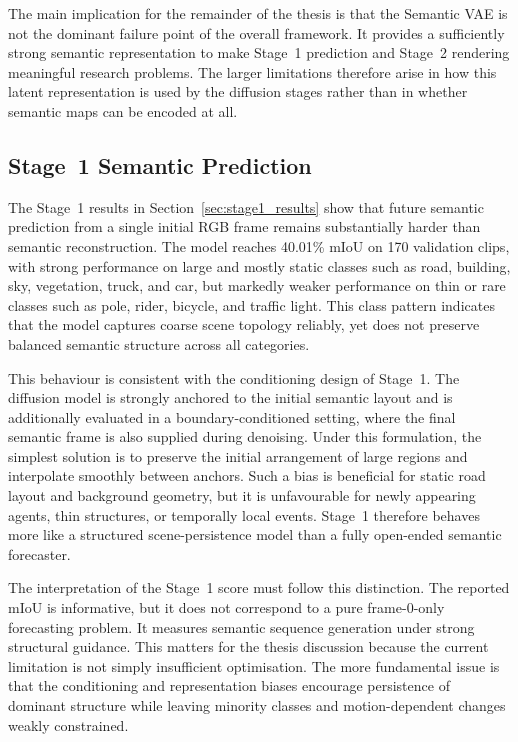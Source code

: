 The main implication for the remainder of the thesis is that the Semantic VAE is not the dominant failure point of the overall framework. It provides a sufficiently strong semantic representation to make Stage~1 prediction and Stage~2 rendering meaningful research problems. The larger limitations therefore arise in how this latent representation is used by the diffusion stages rather than in whether semantic maps can be encoded at all.

\subsection{Stage~1 Semantic Prediction}
\label{subsec:stage1_discussion}

The Stage~1 results in Section~\ref{sec:stage1_results} show that future semantic prediction from a single initial RGB frame remains substantially harder than semantic reconstruction. The model reaches 40.01\% mIoU on 170 validation clips, with strong performance on large and mostly static classes such as road, building, sky, vegetation, truck, and car, but markedly weaker performance on thin or rare classes such as pole, rider, bicycle, and traffic light. This class pattern indicates that the model captures coarse scene topology reliably, yet does not preserve balanced semantic structure across all categories.

This behaviour is consistent with the conditioning design of Stage~1. The diffusion model is strongly anchored to the initial semantic layout and is additionally evaluated in a boundary-conditioned setting, where the final semantic frame is also supplied during denoising. Under this formulation, the simplest solution is to preserve the initial arrangement of large regions and interpolate smoothly between anchors. Such a bias is beneficial for static road layout and background geometry, but it is unfavourable for newly appearing agents, thin structures, or temporally local events. Stage~1 therefore behaves more like a structured scene-persistence model than a fully open-ended semantic forecaster.

The interpretation of the Stage~1 score must follow this distinction. The reported mIoU is informative, but it does not correspond to a pure frame-0-only forecasting problem. It measures semantic sequence generation under strong structural guidance. This matters for the thesis discussion because the current limitation is not simply insufficient optimisation. The more fundamental issue is that the conditioning and representation biases encourage persistence of dominant structure while leaving minority classes and motion-dependent changes weakly constrained.

